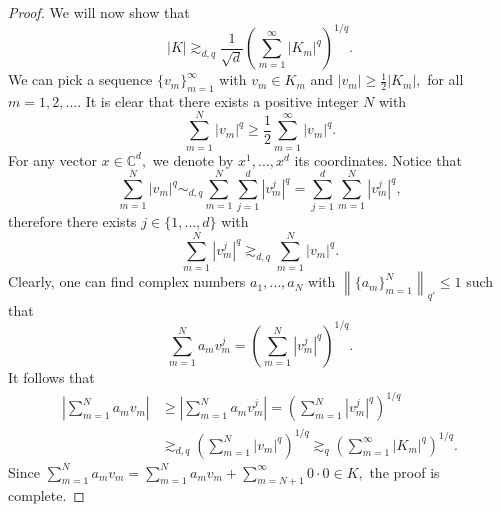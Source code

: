 \documentclass{article}
\theoremstyle{definition}
\theoremstyle{remark}
\numberwithin{equation}{section}
\newcommand{\norm}[2]{\left\|{#1}\right\|_{{#2}}}
\newcommand{\complex}{\mathbb{C}}
\newcommand{\1}{\mathbf{1}}
\begin{document}
\begin{proof}
        We will now show that
        \begin{equation*}
            |K|\gtrsim_{d,q}\frac{1}{\sqrt{d}}\left(\sum_{m=1}^{\infty}|K_m|^{q}\right)^{1/q}.
        \end{equation*}
        We can pick a sequence $\{ v_m\}_{m=1}^{\infty}$ with $v_m\in K_m$ and $|v_m|\geq\frac{1}{2}|K_m|,$ for all $m=1,2,\ldots.$ It is clear that there exists a positive integer $N$ with
        \begin{equation*}
            \sum_{m=1}^{N}|v_m|^{q}\geq\frac{1}{2}\sum_{m=1}^{\infty}|v_m|^{q}.
        \end{equation*}
        For any vector $x\in\complex^d,$ we denote by $x^{1},\ldots,x^{d}$ its coordinates. Notice that
        \begin{equation*}
            \sum_{m=1}^{N}|v_m|^{q}\sim_{d,q}\sum_{m=1}^{N}\sum_{j=1}^{d}|v_m^{j}|^q=\sum_{j=1}^{d}\sum_{m=1}^{N}|v_m^{j}|^q,
        \end{equation*}
        therefore there exists $j\in\{1,\ldots,d\}$ with
        \begin{equation*}
            \sum_{m=1}^{N}|v_m^{j}|^q\gtrsim_{d,q}\sum_{m=1}^{N}|v_m|^{q}.
        \end{equation*}
        Clearly, one can find complex numbers $a_1,\ldots,a_{N}$ with $\norm{\{a_m\}_{m=1}^N}{q'}\leq1$ such that
        \begin{equation*}
            \sum_{m=1}^{N}a_mv_m^{j}=\left(\sum_{m=1}^{N}|v_m^{j}|^q\right)^{1/q}.
        \end{equation*}
        It follows that
        \begin{align*}
            \left|\sum_{m=1}^{N}a_mv_m\right|&\geq\left|\sum_{m=1}^{N}a_mv_m^{j}\right|=\left(\sum_{m=1}^{N}|v_m^{j}|^q\right)^{1/q}\\
            &\gtrsim_{d,q}\left(\sum_{m=1}^{N}|v_m|^{q}\right)^{1/q}\gtrsim_{q}\left(\sum_{m=1}^{\infty}|K_m|^{q}\right)^{1/q}.
        \end{align*}
        Since $\sum_{m=1}^{N}a_mv_m=\sum_{m=1}^{N}a_mv_m+\sum_{m=N+1}^{\infty}0\cdot 0\in K,$ the proof is complete.
    \end{proof}
\end{document}
